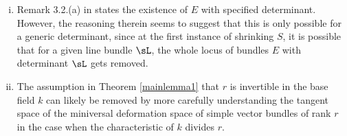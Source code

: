 \begin{enumerate}[(i)]
    \item Remark 3.2.(a) in \cite{seshadri} states the existence of $E$ with specified determinant. However, the reasoning therein seems to suggest that this is only possible for a generic determinant, since at the first instance of shrinking $S$, it is possible that for a given line bundle $\sL$, the whole locus of bundles $E$ with determinant $\sL$ gets removed.
    
    \item The assumption in Theorem \ref{mainlemma1} that $r$ is invertible in the base field $k$ can likely be removed by more carefully understanding the tangent space of the miniversal deformation space of simple vector bundles of rank $r$ in the case when the characteristic of $k$ divides $r$.
\end{enumerate}
